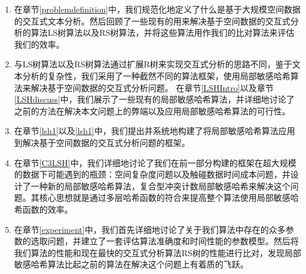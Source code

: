\begin{enumerate}[$ \bullet $]
	\item 在章节\ref{problemdefinition}中，我们规范化地定义了什么是基于大规模空间数据的交互式文本分析。然后回顾了一些现有的用来解决基于空间数据的交互式分析的算法LS树算法以及RS树算法，并将这些算法用作我们的比对算法来评估我们的效率。
	
	\item 与LS树算法以及RS树算法通过扩展R树来实现交互式分析的思路不同，鉴于文本分析的复杂性，我们采用了一种截然不同的算法框架，使用局部敏感哈希算法来解决基于空间数据的交互式分析问题。 在章节\ref{LSHIntro}以及章节\ref{LSHdiscuss}中，我们展示了一些现有的局部敏感哈希算法，并详细地讨论了之前的方法在解决本文问题上的弊端以及应用局部敏感哈希算法的可行性。
	
	\item 在章节\ref{lsh1}以及\ref{lsh1}中，我们提出并系统地构建了将局部敏感哈希算法应用到解决基于空间数据的交互式分析问题的框架。
	
	\item 在章节\ref{C3LSH}中，我们详细地讨论了我们在前一部分构建的框架在超大规模的数据下可能遇到的瓶颈：空间复杂度问题以及触碰数据时间成本问题，并设计了一种新的局部敏感哈希算法，复合型冲突计数局部敏感哈希来解决这个问题。其核心思想就是通过多层哈希函数的符合来提高整个算法使用局部敏感哈希函数的效率。
	
	\item 在章节\ref{experiment}中，我们首先详细地讨论了关于我们算法中存在的众多参数的选取问题，并建立了一套评估算法准确度和时间性能的参数模型。然后将我们算法的性能和现在最快的交互式分析算法RS树的性能进行比对，发现局部敏感哈希算法比起之前的算法在解决这个问题上有着质的飞跃。
\end{enumerate}





